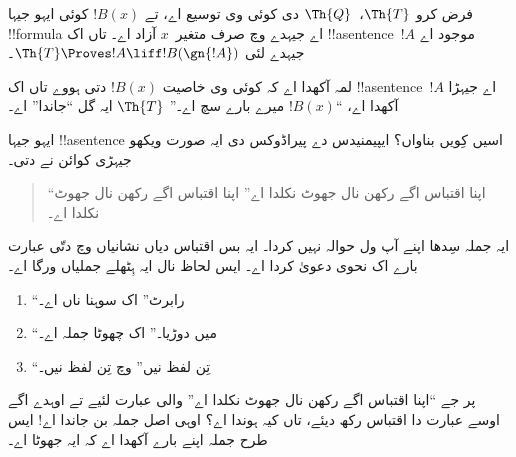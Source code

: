 \documentclass[../../../include/open-logic-section]{subfiles}
\begin{document}
\begin{lem}
فرض کرو $\Th{T}$،~$\Th{Q}$ دی کوئی وی توسیع اے، تے $!B(x)$
کوئی ایہو جیہا !!{formula} اے جیہدے وچ صرف متغیر~$x$ آزاد اے۔
تاں اک !!a{sentence}~$!A$ موجود اے جیہدے لئی
$\Th{T} \Proves!A \liff !B(\gn{!A})$۔
\end{lem}

لمہ آکھدا اے کہ کوئی وی خاصیت $!B(x)$ دتی ہووے تاں اک
!!a{sentence}~$!A$ اے جیہڑا آکھدا اے، “$!B(x)$ میرے بارے
سچ اے۔” $\Th{T}$ ایہ گل “جاندا” اے۔

ایہو جیہا !!a{sentence} اسیں کِویں بناواں؟ ایپیمنیدس دے
پیراڈوکس دی ایہ صورت ویکھو جیہڑی کوائن نے دتی۔
\begin{quote}
“اپنا اقتباس اگے رکھن نال جھوٹ نکلدا اے” اپنا اقتباس اگے
رکھن نال جھوٹ نکلدا اے۔
\end{quote}
ایہ جملہ سِدھا اپنے آپ ول حوالہ نہیں کردا۔ ایہ بس اقتباس
دیاں نشانیاں وچ دتّی عبارت بارے اک نحوی دعویٰ کردا اے۔
ایس لحاظ نال ایہ ہِٹھلے جملیاں ورگا اے۔
\begin{enumerate}
\item “رابرٹ” اک سوہنا ناں اے۔
\item “میں دوڑیا۔” اک چھوٹا جملہ اے۔
\item “تِن لفظ نیں” وچ تِن لفظ نیں۔
\end{enumerate}
پر جے “اپنا اقتباس اگے رکھن نال جھوٹ نکلدا اے” والی عبارت
لئیے تے اوہدے اگے اوسے عبارت دا اقتباس رکھ دیئے، تاں کیہ
ہوندا اے؟ اوہی اصل جملہ بن جاندا اے!{} ایس طرح جملہ اپنے
بارے آکھدا اے کہ ایہ جھوٹا اے۔
\end{document}
